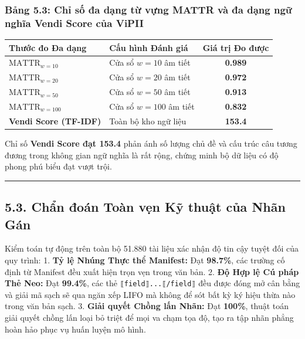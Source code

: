 \documentclass[
  11pt,
  a4paper,
]{article}
\newcounter{none} %
\begin{document}
\subsubsection{Bảng 5.3: Chỉ số đa dạng từ vựng MATTR và đa dạng ngữ nghĩa Vendi Score của
ViPII}\label{bux1ea3ng-5.3-chux1ec9-sux1ed1-ux111a-dux1ea1ng-tux1eeb-vux1ef1ng-mattr-vuxe0-ux111a-dux1ea1ng-ngux1eef-nghux129a-vendi-score-cux1ee7a-vipii}

{\def\LTcaptype{none} %
\begin{longtable}[]{@{}llc@{}}
\toprule\noalign{}
Thước đo Đa dạng & Cấu hình Đánh giá & Giá trị Đo được \\
\midrule\noalign{}
\endhead
\bottomrule\noalign{}
\endlastfoot
\textbf{\(\text{MATTR}_{w=10}\)} & Cửa sổ \(w = 10\) âm tiết & \textbf{0.989} \\
\textbf{\(\text{MATTR}_{w=20}\)} & Cửa sổ \(w = 20\) âm tiết & \textbf{0.972} \\
\textbf{\(\text{MATTR}_{w=50}\)} & Cửa sổ \(w = 50\) âm tiết & \textbf{0.913} \\
\textbf{\(\text{MATTR}_{w=100}\)} & Cửa sổ \(w = 100\) âm tiết & \textbf{0.832} \\
\textbf{Vendi Score (TF-IDF)} & Toàn bộ kho ngữ liệu & \textbf{153.4} \\
\end{longtable}
}

Chỉ số \textbf{Vendi Score đạt 153.4} phản ánh số lượng chủ đề và cấu trúc câu tương đương trong
không gian ngữ nghĩa là rất rộng, chứng minh bộ dữ liệu có độ phong phú biểu đạt vượt trội.

\begin{center}\rule{0.5\linewidth}{0.5pt}\end{center}

\subsection{5.3. Chẩn đoán Toàn vẹn Kỹ thuật của Nhãn
Gán}\label{chux1ea9n-ux111ouxe1n-touxe0n-vux1eb9n-kux1ef9-thuux1eadt-cux1ee7a-nhuxe3n-guxe1n}

Kiểm toán tự động trên toàn bộ 51.880 tài liệu xác nhận độ tin cậy tuyệt đối của quy trình: 1.
\textbf{Tỷ lệ Nhúng Thực thể Manifest:} Đạt \textbf{98.7\%}, các trường cố định từ Manifest đều xuất
hiện trọn vẹn trong văn bản. 2. \textbf{Độ Hợp lệ Cú pháp Thẻ Neo:} Đạt \textbf{99.4\%}, các thẻ
\texttt{⟦field⟧...⟦/field⟧} đều được đóng mở cân bằng và giải mã sạch sẽ qua ngăn xếp LIFO mà không
để sót bất kỳ ký hiệu thừa nào trong văn bản sạch. 3. \textbf{Giải quyết Chồng lấn Nhãn:} Đạt
\textbf{100\%}, thuật toán giải quyết chồng lấn loại bỏ triệt để mọi va chạm tọa độ, tạo ra tập nhãn
phẳng hoàn hảo phục vụ huấn luyện mô hình.
\end{document}
